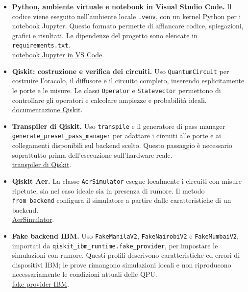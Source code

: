 ﻿\documentclass[a4paper,12pt]{article}
\begin{document}
\begin{itemize}
    \item \textbf{Python, ambiente virtuale e notebook in Visual Studio Code.}
    Il codice viene eseguito nell'ambiente locale \texttt{.venv}, con un
    kernel Python per i notebook Jupyter. Questo formato permette di
    affiancare codice, spiegazioni, grafici e risultati.
    Le dipendenze del progetto sono elencate in \texttt{requirements.txt}.\\
    \href{https://code.visualstudio.com/docs/datascience/jupyter-notebooks}{notebook Jupyter in VS Code}.

    \item \textbf{Qiskit: costruzione e verifica dei circuiti.}
    Uso \texttt{QuantumCircuit} per costruire l'oracolo, il diffusore e
    il circuito completo, inserendo esplicitamente le porte e le misure.
    Le classi \texttt{Operator} e \texttt{Statevector} permettono di
    controllare gli operatori e calcolare ampiezze e probabilità ideali.\\
    \href{https://quantum.cloud.ibm.com/docs/en/api/qiskit}{documentazione Qiskit}.

    \item \textbf{Transpiler di Qiskit.}
    Uso \texttt{transpile} e il generatore di pass manager\\
    \texttt{generate\_preset\_pass\_manager} per adattare i circuiti
    alle porte e ai collegamenti disponibili sul backend scelto.
    Questo passaggio è necessario soprattutto prima dell'esecuzione
    sull'hardware reale.\\
    \href{https://quantum.cloud.ibm.com/docs/en/api/qiskit/transpiler}{transpiler di Qiskit}.

    \item \textbf{Qiskit Aer.}
    La classe \texttt{AerSimulator} esegue localmente i circuiti con
    misure ripetute, sia nel caso ideale sia in presenza di rumore.
    Il metodo \texttt{from\_backend} configura il simulatore a partire
    dalle caratteristiche di un backend.\\
    \href{https://qiskit.github.io/qiskit-aer/stubs/qiskit_aer.AerSimulator.html}{AerSimulator}.

    \item \textbf{Fake backend IBM.}
    Uso \texttt{FakeManilaV2}, \texttt{FakeNairobiV2} e
    \texttt{FakeMumbaiV2}, importati da
    \texttt{qiskit\_ibm\_runtime.fake\_provider}, per impostare le
    simulazioni con rumore. Questi profili descrivono caratteristiche
    ed errori di dispositivi IBM; le prove rimangono simulazioni locali
    e non riproducono necessariamente le condizioni attuali delle QPU.
    \\\href{https://quantum.cloud.ibm.com/docs/en/api/qiskit-ibm-runtime/fake-provider}{fake provider IBM}.


\end{itemize}
\end{document}
